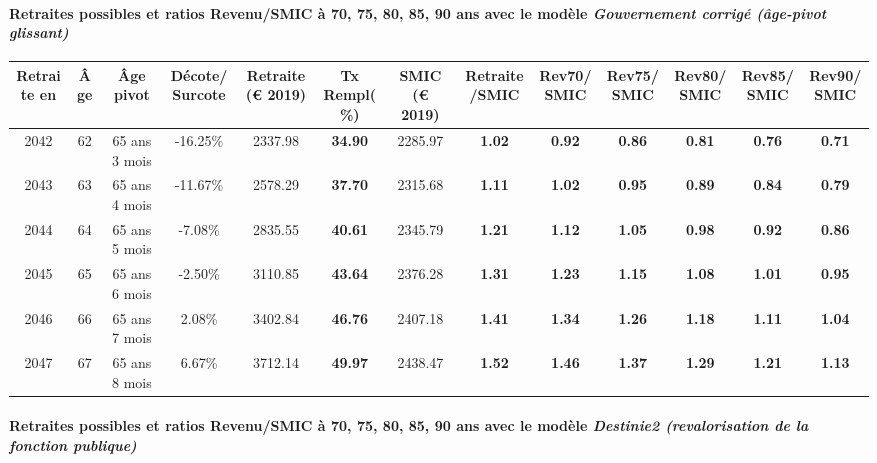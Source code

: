 \paragraph{Retraites possibles et ratios Revenu/SMIC à 70, 75, 80, 85, 90 ans avec le modèle \emph{Gouvernement corrigé (âge-pivot glissant)}}  
 
{ \scriptsize \begin{center} 
\begin{tabular}[htb]{|c|c||c|c||c|c||c||c|c|c|c|c|c|} 
\hline 
 Retraite en &  Âge &  Âge pivot &  Décote/Surcote &  Retraite (\euro{} 2019) &  Tx Rempl(\%) &  SMIC (\euro{} 2019) &  Retraite/SMIC &  Rev70/SMIC &  Rev75/SMIC &  Rev80/SMIC &  Rev85/SMIC &  Rev90/SMIC \\ 
\hline \hline 
 2042 &  62 &  65 ans 3 mois &  -16.25\% &  2337.98 &  {\bf 34.90} &  2285.97 &  {\bf 1.02} &  {\bf {\color{red} 0.92}} &  {\bf {\color{red} 0.86}} &  {\bf {\color{red} 0.81}} &  {\bf {\color{red} 0.76}} &  {\bf {\color{red} 0.71}} \\ 
\hline 
 2043 &  63 &  65 ans 4 mois &  -11.67\% &  2578.29 &  {\bf 37.70} &  2315.68 &  {\bf 1.11} &  {\bf 1.02} &  {\bf {\color{red} 0.95}} &  {\bf {\color{red} 0.89}} &  {\bf {\color{red} 0.84}} &  {\bf {\color{red} 0.79}} \\ 
\hline 
 2044 &  64 &  65 ans 5 mois &  -7.08\% &  2835.55 &  {\bf 40.61} &  2345.79 &  {\bf 1.21} &  {\bf 1.12} &  {\bf 1.05} &  {\bf {\color{red} 0.98}} &  {\bf {\color{red} 0.92}} &  {\bf {\color{red} 0.86}} \\ 
\hline 
 2045 &  65 &  65 ans 6 mois &  -2.50\% &  3110.85 &  {\bf 43.64} &  2376.28 &  {\bf 1.31} &  {\bf 1.23} &  {\bf 1.15} &  {\bf 1.08} &  {\bf 1.01} &  {\bf {\color{red} 0.95}} \\ 
\hline 
 2046 &  66 &  65 ans 7 mois &  2.08\% &  3402.84 &  {\bf 46.76} &  2407.18 &  {\bf 1.41} &  {\bf 1.34} &  {\bf 1.26} &  {\bf 1.18} &  {\bf 1.11} &  {\bf 1.04} \\ 
\hline 
 2047 &  67 &  65 ans 8 mois &  6.67\% &  3712.14 &  {\bf 49.97} &  2438.47 &  {\bf 1.52} &  {\bf 1.46} &  {\bf 1.37} &  {\bf 1.29} &  {\bf 1.21} &  {\bf 1.13} \\ 
\hline 
\hline 
\end{tabular} 
\end{center} } 
\paragraph{Retraites possibles et ratios Revenu/SMIC à 70, 75, 80, 85, 90 ans avec le modèle \emph{Destinie2 (revalorisation de la fonction publique)}}  
 
